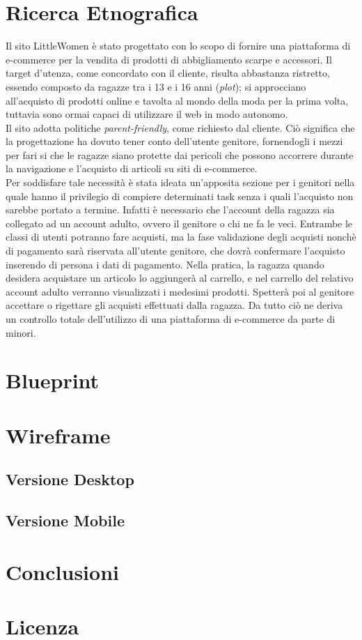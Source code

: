 \documentclass[12pt,a4paper]{report}
\begin{document}
\chapter{Ricerca Etnografica}
Il sito LittleWomen è stato progettato con lo scopo di fornire una piattaforma di e-commerce per la vendita di prodotti di abbigliamento scarpe e accessori. Il target d'utenza, come concordato con il cliente, risulta abbastanza ristretto, essendo composto da ragazze tra i 13 e i 16 anni (\textit{plot}); si approcciano all'acquisto di prodotti online e tavolta al mondo della moda per la prima volta, tuttavia sono ormai capaci di utilizzare il web in modo autonomo.\\
Il sito adotta politiche \textit{parent-friendly}, come richiesto dal cliente. Ciò significa che la progettazione ha dovuto tener conto dell'utente genitore, fornendogli i mezzi per fari si che le ragazze siano protette dai pericoli che possono accorrere durante la navigazione e l'acquisto di articoli su siti di e-commerce. \\
Per soddisfare tale necessità è stata ideata un'apposita sezione per i genitori nella quale hanno il privilegio di compiere determinati task senza i quali l'acquisto non sarebbe portato a termine. Infatti è necessario che l'account della ragazza sia collegato ad un account adulto, ovvero il genitore o chi ne fa le veci. Entrambe le classi di utenti potranno fare acquisti, ma la fase validazione degli acquisti nonchè di pagamento sarà riservata all'utente genitore, che dovrà confermare l'acquisto inserendo di persona i dati di pagamento. Nella pratica, la ragazza quando desidera acquistare un articolo lo aggiungerà al carrello, e nel carrello del relativo account adulto verranno visualizzati i medesimi prodotti. Spetterà poi al genitore accettare o rigettare gli acquisti effettuati dalla ragazza. Da tutto ciò ne deriva un controllo totale dell'utilizzo di una piattaforma di e-commerce da parte di minori.
\chapter{Blueprint}
\chapter{Wireframe}
\section{Versione Desktop}
\section{Versione Mobile}
\chapter{Conclusioni}
\chapter{Licenza}
\end{document}
